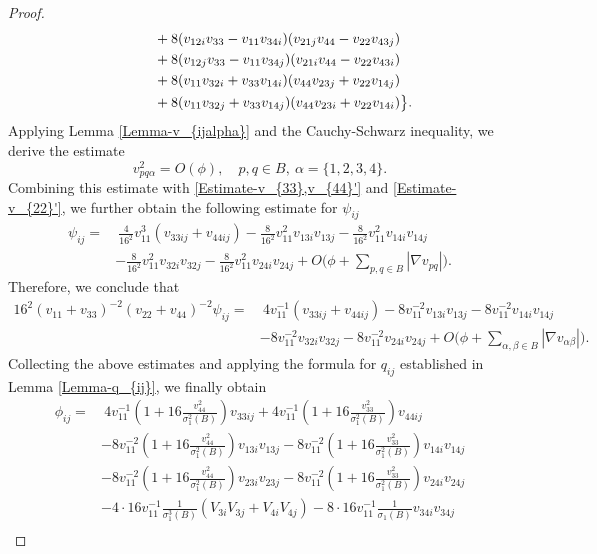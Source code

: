 \documentclass[11pt]{amsart}
\numberwithin{theorem}{section}
\numberwithin{equation}{section}
\begin{document}
\begin{proof}
\begin{align*}
&\hspace{1.2cm}+8(v_{12i}v_{33}-v_{11}v_{34i})(v_{21j}v_{44}-v_{22}v_{43j})\\
&\hspace{1.2cm}+8(v_{12j}v_{33}-v_{11}v_{34j})(v_{21i}v_{44}-v_{22}v_{43i})\\
&\hspace{1.2cm}+8(v_{11}v_{32i}+v_{33}v_{14i})(v_{44}v_{23j}+v_{22}v_{14j})\\
&\hspace{1.2cm}+8(v_{11}v_{32j}+v_{33}v_{14j})(v_{44}v_{23i}+v_{22}v_{14i})\big\}.
\end{align*}
Applying Lemma \ref{Lemma-v_{ijalpha}} and the Cauchy-Schwarz inequality, we derive the estimate $$v_{pq\alpha}^2=O(\phi),\quad p,q\in B,\ \alpha=\{1,2,3,4\}.$$ Combining this estimate with \eqref{Estimate-v_{33},v_{44}'} and \eqref{Estimate-v_{22}'}, we further obtain the following estimate for $\psi_{ij}$
\begin{align*}
\psi_{ij}
=&~\frac{4}{16^2}v_{11}^3(v_{33ij}+v_{44ij})-\frac{8}{16^2}v_{11}^2v_{13i}v_{13j}-\frac{8}{16^2}v_{11}^2v_{14i}v_{14j}\\
&-\frac{8}{16^2}v_{11}^2v_{32i}v_{32j}-\frac{8}{16^2}v_{11}^2v_{24i}v_{24j}+O\bigg(\phi+\sum_{p,q\in B}|\nabla v_{pq}|\bigg).
\end{align*}
Therefore, we conclude that
\begin{align*}
16^2(v_{11}+v_{33})^{-2}(v_{22}+v_{44})^{-2}\psi_{ij}=&~4v_{11}^{-1}(v_{33ij}+v_{44ij})-8v_{11}^{-2}v_{13i}v_{13j}-8v_{11}^{-2}v_{14i}v_{14j}\\
&-8v_{11}^{-2}v_{32i}v_{32j}-8v_{11}^{-2}v_{24i}v_{24j}+O\bigg(\phi+\sum_{\alpha,\beta\in B}|\nabla v_{\alpha\beta}|\bigg).
\end{align*}
Collecting the above estimates and applying the formula for $q_{ij}$ established in Lemma \ref{Lemma-q_{ij}}, we finally obtain
\begin{align*}
\phi_{ij}
=&~4v_{11}^{-1}\left(1+16\frac{v_{44}^2}{\sigma_1^2(B)}\right)v_{33ij}+4v_{11}^{-1}\left(1+16\frac{v_{33}^2}{\sigma_1^2(B)}\right)v_{44ij}\\
&-8v_{11}^{-2}\left(1+16\frac{v_{44}^2}{\sigma_1^2(B)}\right)v_{13i}v_{13j}-8v_{11}^{-2}\left(1+16\frac{v_{33}^2}{\sigma_1^2(B)}\right)v_{14i}v_{14j}\\
&-8v_{11}^{-2}\left(1+16\frac{v_{44}^2}{\sigma_1^2(B)}\right)v_{23i}v_{23j}-8v_{11}^{-2}\left(1+16\frac{v_{33}^2}{\sigma_1^2(B)}\right)v_{24i}v_{24j}\\
&-4\cdot16v_{11}^{-1}\frac{1}{\sigma_1^3(B)}(V_{3i}V_{3j}+V_{4i}V_{4j})-8\cdot16v_{11}^{-1}\frac{1}{\sigma_1(B)}v_{34i}v_{34j}\\

\end{align*}
\end{proof}
\end{document}
